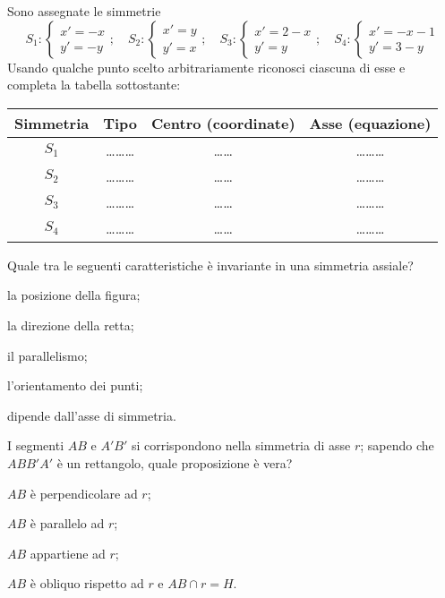 \begin{esercizio}
\label{ese:8.39} %
Sono assegnate le simmetrie
\[S_1:\begin{cases}x'=-x\\y'=-y\end{cases};\quad S_2:\begin{cases}x'=y\\y'=x\end{cases};\quad
S_3:\begin{cases}x'=2-x\\y'=y\end{cases};\quad S_4:\begin{cases}x'=-x-1\\y'=3-y\end{cases}\]
Usando qualche punto scelto arbitrariamente riconosci ciascuna di esse e completa la tabella sottostante:
\begin{center}
\begin{tabular}{cccc}
\toprule
Simmetria & Tipo & Centro (coordinate) & Asse (equazione)\\
\midrule
$S_1$ & \ldots\ldots\ldots{} & \ldots\ldots{} & \ldots\ldots\ldots{} \\
$S_2$ & \ldots\ldots\ldots{} & \ldots\ldots{} & \ldots\ldots\ldots{} \\
$S_3$ & \ldots\ldots\ldots{} & \ldots\ldots{} & \ldots\ldots\ldots{} \\
$S_4$ & \ldots\ldots\ldots{} & \ldots\ldots{} & \ldots\ldots\ldots{} \\
\bottomrule
\end{tabular}
\end{center}
\end{esercizio}

\begin{esercizio}
\label{ese:8.40} %
Quale tra le seguenti caratteristiche è invariante in una simmetria assiale?
\begin{enumeratea}
\item la posizione della figura;
\item la direzione della retta;
\item il parallelismo;
\item l'orientamento dei punti;
\item dipende dall'asse di simmetria.
\end{enumeratea}
\end{esercizio}

\begin{esercizio}
\label{ese:8.41} %
I segmenti $AB$ e $A'B'$ si corrispondono nella simmetria di asse $r$; sapendo che $ABB'A'$ è un rettangolo, quale proposizione è vera?
\begin{enumeratea}
\item $AB$ è perpendicolare ad $r$;
\item $AB$ è parallelo ad $r$;
\item $AB$ appartiene ad $r$;
\item $AB$ è obliquo rispetto ad $r$ e $AB\cap r=H$.
\end{enumeratea}
\end{esercizio}

